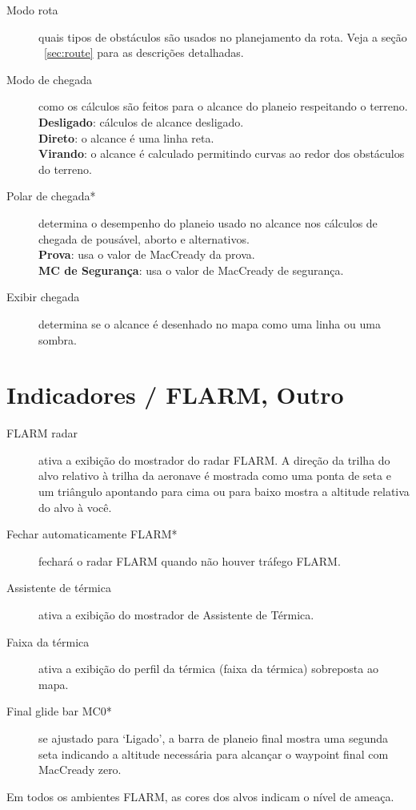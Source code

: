 \begin{description}
\item[Modo rota]  \label{conf:routemode} quais tipos de obstáculos são usados no planejamento da rota.  Veja a seção ~\ref{sec:route} 
para as descrições detalhadas.
\item[Modo de chegada]  \label{conf:turningreach} como os cálculos são feitos para o alcance do planeio respeitando o terreno. \\
  {\bf Desligado}: cálculos de alcance desligado. \\
  {\bf Direto}: o alcance é uma linha reta. \\
  {\bf Virando}: o alcance é calculado permitindo curvas ao redor dos obstáculos do terreno.
\item[Polar de chegada*]  \label{conf:reachpolar} determina o desempenho do planeio usado no alcance nos cálculos de chegada de pousável, aborto e alternativos. \\
  {\bf Prova}: usa o valor de MacCready da prova. \\
  {\bf MC de Segurança}: usa o valor de MacCready de segurança.
\item[Exibir chegada] \label{conf:arrivaldisplay} determina se o alcance é desenhado no mapa como uma linha ou uma sombra.
\end{description}

\section{Indicadores / FLARM, Outro} \label{sec:flarmandother-gauge}

\begin{description}
\item[FLARM radar]  \label{conf:flarmdisplay} ativa a exibição do mostrador do radar FLARM.  A direção da trilha do alvo relativo à trilha da aeronave é mostrada como uma ponta de seta e um triângulo apontando para cima ou para baixo mostra a altitude relativa do alvo à você.
\\
\item[Fechar automaticamente FLARM*]  fechará o radar FLARM quando não houver tráfego FLARM.
\item[Assistente de térmica] \label{conf:thermalassistant} ativa a exibição do mostrador de Assistente de Térmica.
\item[Faixa da térmica] \label{conf:thermalband} ativa a exibição do perfil da térmica (faixa da térmica) sobreposta ao mapa.
\item[Final glide bar MC0*]  se ajustado para ‘Ligado’, a barra de planeio final mostra uma segunda seta indicando a altitude necessária para alcançar o waypoint final com MacCready zero.
\end{description}
Em todos os ambientes FLARM, as cores dos alvos indicam o nível de ameaça.

